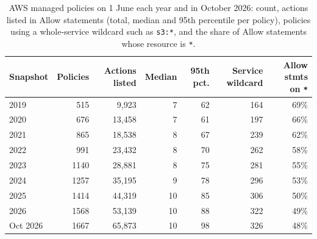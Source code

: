 \begin{table}[t]
\centering
\caption{AWS managed policies on 1 June each year and in October 2026: count, actions listed in Allow statements (total, median and 95th percentile per policy), policies using a whole-service wildcard such as \texttt{s3:*}, and the share of Allow statements whose resource is \texttt{*}.}
\label{tab:snap}
\small
\setlength{\tabcolsep}{3.5pt}
\begin{tabular}{lrrrrrr}
\toprule
Snapshot & Policies & Actions listed & Median & 95th pct. & Service wildcard & Allow stmts on \texttt{*} \\
\midrule
2019 & 515 & 9,923 & 7 & 62 & 164 & 69\% \\
2020 & 676 & 13,458 & 7 & 61 & 197 & 66\% \\
2021 & 865 & 18,538 & 8 & 67 & 239 & 62\% \\
2022 & 991 & 23,432 & 8 & 70 & 262 & 58\% \\
2023 & 1140 & 28,881 & 8 & 75 & 281 & 55\% \\
2024 & 1257 & 35,195 & 9 & 78 & 296 & 53\% \\
2025 & 1414 & 44,319 & 10 & 85 & 306 & 50\% \\
2026 & 1568 & 53,139 & 10 & 88 & 322 & 49\% \\
Oct 2026 & 1667 & 65,873 & 10 & 98 & 326 & 48\% \\
\bottomrule
\end{tabular}
\end{table}
